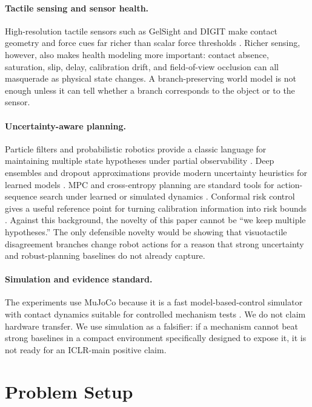 \documentclass{article}
\begin{document}
\paragraph{Tactile sensing and sensor health.}
High-resolution tactile sensors such as GelSight and DIGIT make contact geometry and force cues far richer than scalar force thresholds \citep{yuan2017,lambeta2020}. Richer sensing, however, also makes health modeling more important: contact absence, saturation, slip, delay, calibration drift, and field-of-view occlusion can all masquerade as physical state changes. A branch-preserving world model is not enough unless it can tell whether a branch corresponds to the object or to the sensor.

\paragraph{Uncertainty-aware planning.}
Particle filters and probabilistic robotics provide a classic language for maintaining multiple state hypotheses under partial observability \citep{thrun2002,thrun2005,kaelbling1998}. Deep ensembles and dropout approximations provide modern uncertainty heuristics for learned models \citep{lakshminarayanan2017,gal2016}. MPC and cross-entropy planning are standard tools for action-sequence search under learned or simulated dynamics \citep{bharadhwaj2020}. Conformal risk control gives a useful reference point for turning calibration information into risk bounds \citep{angelopoulos2025}. Against this background, the novelty of this paper cannot be ``we keep multiple hypotheses.'' The only defensible novelty would be showing that visuotactile disagreement branches change robot actions for a reason that strong uncertainty and robust-planning baselines do not already capture.

\paragraph{Simulation and evidence standard.}
The experiments use MuJoCo because it is a fast model-based-control simulator with contact dynamics suitable for controlled mechanism tests \citep{todorov2012}. We do not claim hardware transfer. We use simulation as a falsifier: if a mechanism cannot beat strong baselines in a compact environment specifically designed to expose it, it is not ready for an ICLR-main positive claim.

\section{Problem Setup}
\end{document}
